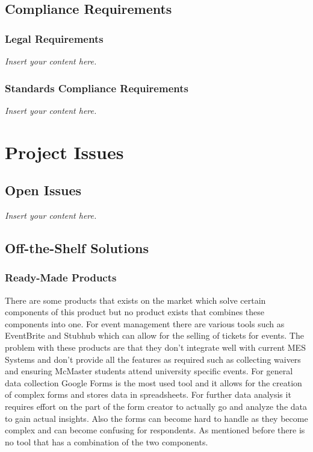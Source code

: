 \documentclass[12pt]{article}
\newcommand{\lips}{\textit{Insert your content here.}}
\begin{document}
\subsection{Compliance Requirements}
\subsubsection{Legal Requirements}
\lips
\subsubsection{Standards Compliance Requirements}
\lips

\section{Project Issues}
\subsection{Open Issues}
\lips

\subsection{Off-the-Shelf Solutions}
\subsubsection{Ready-Made Products}
There are some products that exists on the market which solve certain components of this product but no product exists that combines these components into one. For event management there are various tools such as EventBrite and Stubhub which can allow for the selling of tickets for events. The problem with these products are that they don't integrate well with current MES Systems and don't provide all the features as required such as collecting waivers and ensuring McMaster students attend university specific events. For general data collection Google Forms is the most used tool and it allows for the creation of complex forms and stores data in spreadsheets. For further data analysis it requires effort on the part of the form creator to actually go and analyze the data to gain actual insights. Also the forms can become hard to handle as they become complex and can become confusing for respondents. As mentioned before there is no tool that has a combination of the two components.
\end{document}
